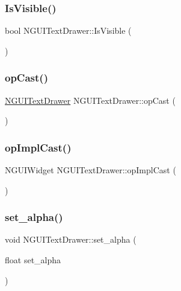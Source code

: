 \subsubsection{\texorpdfstring{Is\+Visible()}{IsVisible()}}
{\footnotesize\ttfamily bool N\+G\+U\+I\+Text\+Drawer\+::\+Is\+Visible (\begin{DoxyParamCaption}{ }\end{DoxyParamCaption})}

\hypertarget{class_n_g_u_i_text_drawer_a6a1a7a05be0328c9df0be9997eb7a98d}{}\label{class_n_g_u_i_text_drawer_a6a1a7a05be0328c9df0be9997eb7a98d} 
\subsubsection{\texorpdfstring{op\+Cast()}{opCast()}}
{\footnotesize\ttfamily \hyperlink{class_n_g_u_i_text_drawer}{N\+G\+U\+I\+Text\+Drawer} N\+G\+U\+I\+Text\+Drawer\+::op\+Cast (\begin{DoxyParamCaption}{ }\end{DoxyParamCaption})}

\hypertarget{class_n_g_u_i_text_drawer_ab5bf74d124af6d7e9f583b815cc6dcd2}{}\label{class_n_g_u_i_text_drawer_ab5bf74d124af6d7e9f583b815cc6dcd2} 
\subsubsection{\texorpdfstring{op\+Impl\+Cast()}{opImplCast()}}
{\footnotesize\ttfamily N\+G\+U\+I\+Widget N\+G\+U\+I\+Text\+Drawer\+::op\+Impl\+Cast (\begin{DoxyParamCaption}{ }\end{DoxyParamCaption})}

\hypertarget{class_n_g_u_i_text_drawer_a6ae90c4308f5fc0aec4163a6e091505c}{}\label{class_n_g_u_i_text_drawer_a6ae90c4308f5fc0aec4163a6e091505c} 
\subsubsection{\texorpdfstring{set\+\_\+alpha()}{set\_alpha()}}
{\footnotesize\ttfamily void N\+G\+U\+I\+Text\+Drawer\+::set\+\_\+alpha (\begin{DoxyParamCaption}\item[{float}]{set\+\_\+alpha }\end{DoxyParamCaption})}

